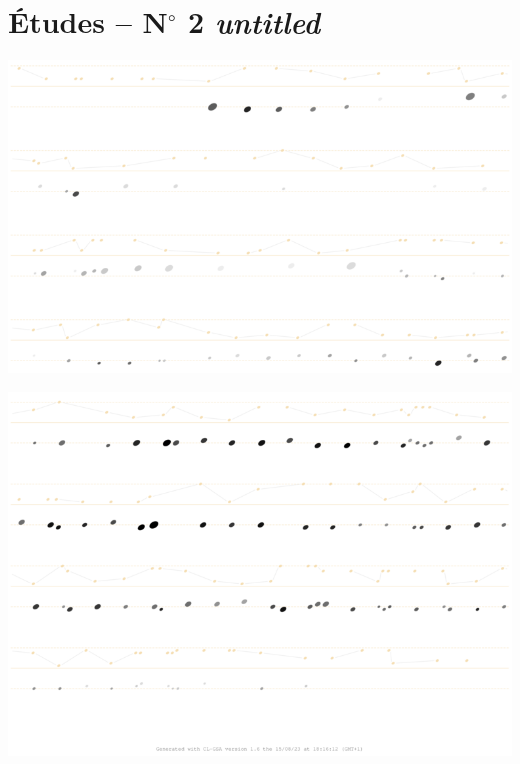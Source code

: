 

\chapter*{\Large \'{E}tudes -- N$^{\circ}$ 2 \textsl{untitled}}
\label{esg}

\vspace{10mm}

\begin{center}
\includegraphics[width=\textwidth]{mp/img/s2-0}
\end{center}

\vspace{-2mm}

\begin{center}
\includegraphics[width=\textwidth]{mp/img/s2-1}
\end{center}

